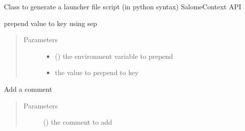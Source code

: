 \documentclass[a4paper,10pt,english]{sphinxmanual}
\begin{document}

\begin{fulllineitems}
\label{\detokenize{commands/apidoc/src:src.fileEnviron.LauncherFileEnviron}}
Class to generate a launcher file script 
(in python syntax) SalomeContext API

\begin{fulllineitems}
\label{\detokenize{commands/apidoc/src:src.fileEnviron.LauncherFileEnviron.add}}
prepend value to key using sep
\begin{quote}\begin{description}
\item[{Parameters}] \leavevmode\begin{itemize}
\item {} 
 () \textendash{} the environment variable to prepend

\item {} 
 \textendash{} the value to prepend to key

\end{itemize}

\end{description}\end{quote}

\end{fulllineitems}


\begin{fulllineitems}
\label{\detokenize{commands/apidoc/src:src.fileEnviron.LauncherFileEnviron.add_comment}}
\end{fulllineitems}


\begin{fulllineitems}
\label{\detokenize{commands/apidoc/src:src.fileEnviron.LauncherFileEnviron.add_echo}}
Add a comment
\begin{quote}\begin{description}
\item[{Parameters}] \leavevmode
{} () \textendash{} the comment to add


\end{description}
\end{quote}
\end{fulllineitems}
\end{fulllineitems}
\end{document}
